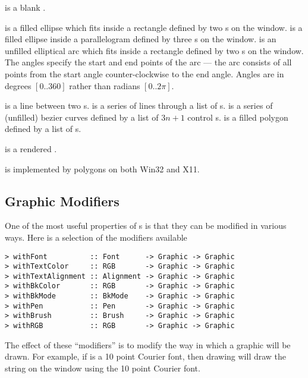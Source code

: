  is a blank .

 is a filled ellipse which fits inside a rectangle
defined by two s on the window.  is a
filled ellipse inside a parallelogram defined by three s
on the window.   is an unfilled elliptical arc which fits
inside a rectangle defined by two s on the window.  The
angles specify the start and end points of the arc --- the arc
consists of all points from the start angle counter-clockwise to the
end angle.  Angles are in degrees $[0..360]$ rather than radians
$[0..2\pi]$.

 is a line between two s.  
is a series of lines through a list of s.
 is a series of (unfilled) bezier curves defined by
a list of $3n+1$ control s.
 is a filled polygon defined by a list of s.

 is a rendered .

\begin{portability}
\item {}
\item {} is implemented by polygons on both Win32 and X11.
\end{portability}


\subsection{Graphic Modifiers}\label{modifiers}

One of the most useful properties of s is that they can
be modified in various ways.  Here is a selection of the modifiers
available

\begin{verbatim}
> withFont          :: Font      -> Graphic -> Graphic
> withTextColor     :: RGB       -> Graphic -> Graphic
> withTextAlignment :: Alignment -> Graphic -> Graphic
> withBkColor       :: RGB       -> Graphic -> Graphic
> withBkMode        :: BkMode    -> Graphic -> Graphic
> withPen           :: Pen       -> Graphic -> Graphic
> withBrush         :: Brush     -> Graphic -> Graphic
> withRGB           :: RGB       -> Graphic -> Graphic
\end{verbatim}

The effect of these ``modifiers'' is to modify the way in which a
graphic will be drawn.  For example, if  is a 10
point Courier font, then drawing  will draw the string  on the window using the
10 point Courier font.

